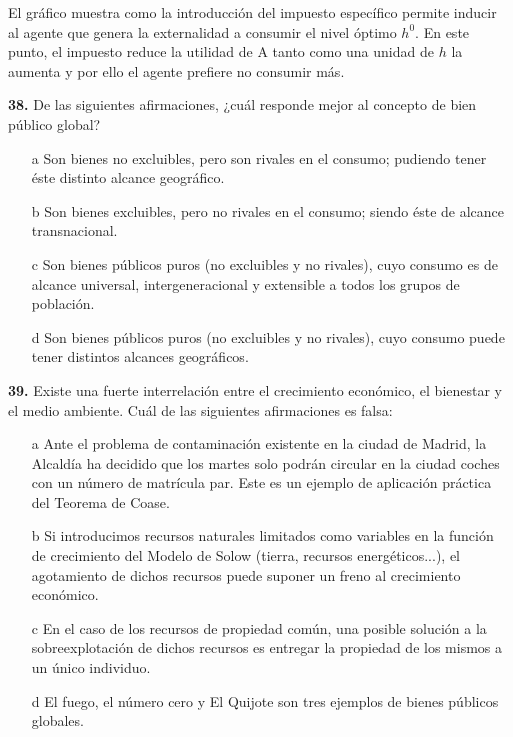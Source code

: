 \documentclass{nuevotema}
\begin{document}
El gráfico muestra como la introducción del impuesto específico permite inducir al agente que genera la externalidad a consumir el nivel óptimo $h^0$. En este punto, el impuesto reduce la utilidad de A tanto como una unidad de $h$ la aumenta y por ello el agente prefiere no consumir más.


\preguntas


\textbf{38.} De las siguientes afirmaciones, ¿cuál responde mejor al concepto de bien público global?

\begin{itemize}
	\item[a] Son bienes no excluibles, pero son rivales en el consumo; pudiendo tener éste distinto alcance geográfico.
	\item[b] Son bienes excluibles, pero no rivales en el consumo; siendo éste de alcance transnacional.
	\item[c] Son bienes públicos puros (no excluibles y no rivales), cuyo consumo es de alcance universal, intergeneracional y extensible a todos los grupos de población.
	\item[d] Son bienes públicos puros (no excluibles y no rivales), cuyo consumo puede tener distintos alcances geográficos.
\end{itemize}


\textbf{39.} Existe una fuerte interrelación entre el crecimiento económico, el bienestar y el medio ambiente. Cuál de las siguientes afirmaciones es falsa:
\begin{itemize}
	\item[a] Ante el problema de contaminación existente en la ciudad de Madrid, la Alcaldía ha decidido que los martes solo podrán circular en la ciudad coches con un número de matrícula par. Este es un ejemplo de aplicación práctica del Teorema de Coase.
	\item[b] Si introducimos recursos naturales limitados como variables en la función de crecimiento del Modelo de Solow (tierra, recursos energéticos...), el agotamiento de dichos recursos puede suponer un freno al crecimiento económico.
	\item[c] En el caso de los recursos de propiedad común, una posible solución a la sobreexplotación de dichos recursos es entregar la propiedad de los mismos a un único individuo.
	\item[d] El fuego, el número cero y El Quijote son tres ejemplos de bienes públicos globales.
\end{itemize}
\end{document}

